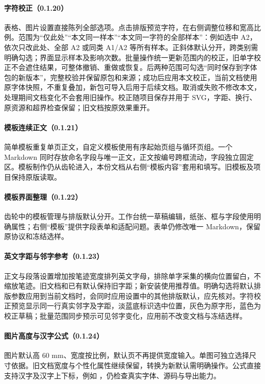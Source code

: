 \paragraph{字符校正（0.1.20）}表格、图片设置直接陈列全部选项。点击排版预览字符，在右侧调整位移和宽高比例。范围为“仅此处”“本文同一样本”“本文同一字符的全部样本”：例如选中 A2，依次只改此处、全部 A2 或同类 A1/A2 等所有样本。正斜体默认分开，跨类别需明确勾选；界面显示样本及影响次数。批量操作统一更新范围内的校正，旧单字校正不会遮住结果，可整体撤销、重做或恢复。后两种范围可勾选“同时保存到字体包的新版本”，完整校验并保留原包和来源；成功后应用本文校正，当前文档使用原字体快照，不重复叠加，新包可导入后用于后续文档。取消或失败不修改本文，处理期间文档变化不会套用旧操作。校正随项目保存并用于 SVG，字距、换行、原资源和超界检查保留；旧文档按原效果重开。

\paragraph{模板连续正文（0.1.21）}简单模板重复单页正文，自定义模板使用有序起始页组与循环页组。一个 Markdown 同时存放命名字段与唯一正文，正文按编号跨框流动，字段独立固定区。模板制作仍从齿轮进入，本份文档从右侧“模板内容”套用和填写。旧模板及项目保持原版读取。

\paragraph{模板界面整理（0.1.22）}齿轮中的模板管理与排版默认分开。工作台统一草稿编辑，纸张、框与字段使用明确属性；右侧“模板”提供字段表单和适配问题。表单仍修改唯一 Markdown，保留原协议和冻结选样。

\paragraph{英文字距与邻字参考（0.1.23）}正文与段落设置增加按笔迹宽度排列英文字母，排除单字采集的横向位置留白，不缩放笔迹。旧文档和已有默认保持旧字距；新安装使用推荐值。明确勾选将默认排版参数应用到当前文档时，会同时应用设置中的其他排版默认，应先核对。字符校正预览显示同一行真实邻字及字距，淡蓝底标识选中位置，灰色为原字形，蓝色为校正草稿；批量范围同步预示可见邻字变化，应用前不改变文档与冻结选样。

\paragraph{图片高度与汉字公式（0.1.24）}图片默认高 60 mm、宽度按比例，默认页不再提供宽度输入。单图可独立选择尺寸依据。旧文档宽度与个性化属性继续保留，转换为新默认需明确操作。公式直接支持汉字及汉字上下标，例如 ，仍检查真实字体、源码与导出能力。

